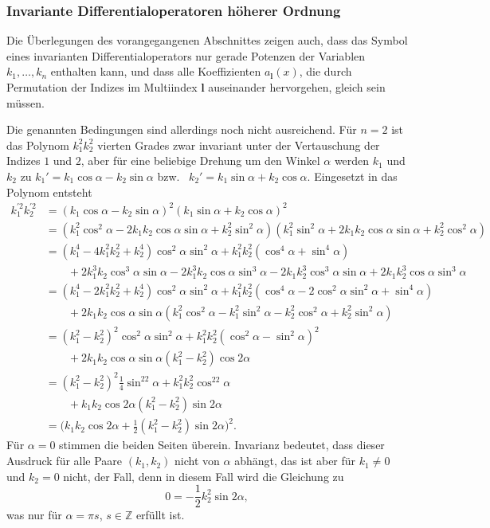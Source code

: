 %
%
\subsubsection{Invariante Differentialoperatoren höherer Ordnung}
Die Überlegungen des vorangegangenen Abschnittes zeigen auch,
dass das Symbol eines invarianten Differentialoperators nur gerade
Potenzen der Variablen $k_1,\dots,k_n$ enthalten kann, und
dass alle Koeffizienten $a_{\bm{l}}(x)$, die durch Permutation der
Indizes im Multiindex $\bm{l}$ auseinander hervorgehen, gleich
sein müssen.

Die genannten Bedingungen sind allerdings noch nicht ausreichend.
Für $n=2$ ist das Polynom $k_1^2k_2^2$ vierten Grades zwar invariant
unter der Vertauschung der Indizes $1$ und $2$, aber für eine
beliebige Drehung um den Winkel $\alpha$ werden $k_1$ und $k_2$
zu
$k_1' = k_1\cos\alpha -k_2\sin\alpha$
bzw.~
$k_2' = k_1\sin\alpha +k_2\cos\alpha$.
Eingesetzt in das Polynom entsteht
\begin{align*}
k_1^{\prime 2}
k_2^{\prime 2}
&=
(k_1\cos\alpha -k_2\sin\alpha)^2
(k_1\sin\alpha +k_2\cos\alpha)^2
\\
&=
(k_1^2\cos^2\alpha -2k_1k_2\cos\alpha\sin\alpha +k_2^2\sin^2\alpha)
(k_1^2\sin^2\alpha +2k_1k_2\cos\alpha\sin\alpha +k_2^2\cos^2\alpha)
\\
&=
(k_1^4-4k_1^2k_2^2+k_2^4)\cos^2\alpha\sin^2\alpha
+
k_1^2k_2^2(\cos^4\alpha+\sin^4\alpha)
\\
&\qquad
+
2k_1^3k_2\cos^3\alpha\sin\alpha
-
2k_1^3k_2\cos\alpha\sin^3\alpha
-
2k_1k_2^3\cos^3\alpha\sin\alpha
+
2k_1k_2^3\cos\alpha\sin^3\alpha
\\
&=
(k_1^4-2k_1^2k_2^2+k_2^4)\cos^2\alpha\sin^2\alpha
+
k_1^2k_2^2(\cos^4\alpha-2\cos^2\alpha\sin^2\alpha+\sin^4\alpha)
\\
&\qquad
+
2k_1k_2\cos\alpha\sin\alpha(
k_1^2\cos^2\alpha
-
k_1^2\sin^2\alpha
-
k_2^2\cos^2\alpha
+
k_2^2\sin^2\alpha
)
\\
&=
(k_1^2-k_2^2)^2
\cos^2\alpha\sin^2\alpha
+
k_1^2k_2^2
(\cos^2\alpha-\sin^2\alpha)^2
\\
&\qquad
+
2k_1k_2
\cos\alpha\sin\alpha
(k_1^2-k_2^2)\cos2\alpha
\\
&=
(k_1^2-k_2^2)^2
\frac14\sin^22\alpha
+
k_1^2k_2^2
\cos^22\alpha
\\
&\qquad
+
k_1k_2
\cos2\alpha
(k_1^2-k_2^2)
\sin2\alpha
\\
&=
\bigl(k_1k_2\cos2\alpha + {\textstyle\frac12}(k_1^2-k_2^2)\sin2\alpha\bigr)^2.
\end{align*}
Für $\alpha=0$ stimmen die beiden Seiten überein.
Invarianz bedeutet, dass dieser Ausdruck für alle Paare $(k_1,k_2)$
nicht von $\alpha$ abhängt, das ist aber für $k_1\ne0$ und $k_2=0$ nicht,
der Fall, denn in diesem Fall wird die Gleichung zu
\[
0
=
-
\frac12 k_2^2\sin2\alpha,
\]
was nur für $\alpha=\pi s$, $s\in\mathbb{Z}$ erfüllt ist.

